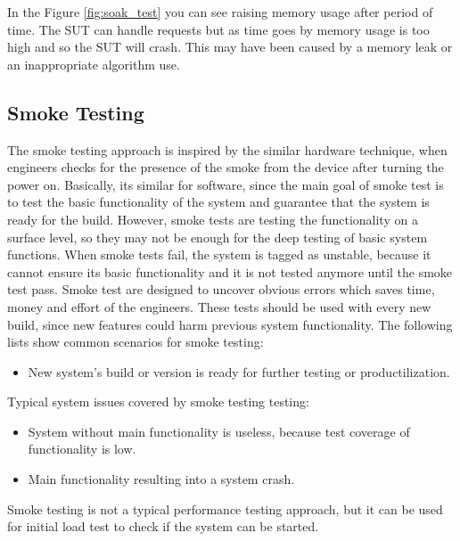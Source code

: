 In the Figure \ref{fig:soak_test} you can see raising memory usage after period of time. The SUT can handle requests but as time goes by memory usage is too high and so the SUT will crash. This may have been caused by a memory leak or an inappropriate algorithm use.

\subsection*{Smoke Testing}
The smoke testing approach is inspired by the similar hardware technique, when engineers checks for the presence of the smoke from the device after turning the power on. Basically, its similar for software, since the main goal of smoke test is to test the basic functionality of the system and guarantee that the system is ready for the build. However, smoke tests are testing the functionality on a surface level, so they may not be enough for the deep testing of basic system functions. When smoke tests fail, the system is tagged as unstable, because it cannot ensure its basic functionality and it is not tested anymore until the smoke test pass. Smoke test are designed to uncover obvious errors which saves time, money and effort of the engineers. These tests should be used with every new build, since new features could harm previous system functionality.
The following lists show common scenarios for smoke testing:
\begin{itemize}
	\setlength\itemsep{0em}
	\item New system's build or version is ready for further testing or productilization.
\end{itemize}
Typical system issues covered by smoke testing testing:
\begin{itemize}
	\setlength\itemsep{0em}
	\item System without main functionality is useless, because test coverage of functionality is low.
	\item Main functionality resulting into a system crash.
\end{itemize}

Smoke testing is not a typical performance testing approach, but it can be used for initial load test to check if the system can be started.


